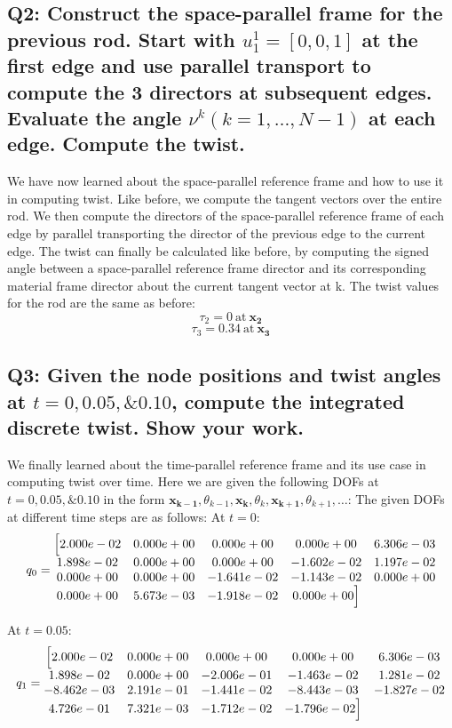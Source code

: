 \documentclass[letterpaper, 10 pt, conference]{ieeeconf}  %
\begin{document}
\subsection*{Q2: Construct the space-parallel frame for the previous rod. Start with $u^1_1 = [0, 0, 1]$ at the first edge and use parallel transport to compute the 3 directors at subsequent edges. Evaluate the angle $ \nu ^ k (k = 1, \dots , N - 1)$ at each edge. Compute the twist. }

We have now learned about the space-parallel reference frame and how to use it in computing twist. Like before, we compute the tangent vectors over the entire rod. We then compute the directors of the space-parallel reference frame of each edge by parallel transporting the director of the previous edge to the current edge. The twist can finally be calculated like before, by computing the signed angle between a space-parallel reference frame director and its corresponding material frame director about the current tangent vector at k. The twist values for the rod are the same as before:
\[ \tau_2 = 0 \ \text{at} \ \mathbf{x_2}\]
\[\tau_3 = 0.34\ \text{at} \ \mathbf{x_3} \]

\subsection*{Q3: Given the node positions and twist angles at $t = 0, 0.05, \& 0.10$, compute the integrated discrete twist. Show your work. }

We finally learned about the time-parallel reference frame and its use case in computing twist over time. Here we are given the following DOFs at $t = 0, 0.05, \& 0.10$ in the form $\mathbf{x_{k-1}}, \theta_{k-1}, \mathbf{x_k}, \theta_k, \mathbf{x_{k+1}}, \theta_{k+1}, \dots$:
The given DOFs at different time steps are as follows:
At \( t = 0 \):
\[ q_0 = \begin{matrix}
\Bigl[2.000e-02 & 0.000e+00 & 0.000e+00 & 0.000e+00 & 6.306e-03  \\
1.898e-02 & 0.000e+00 & 0.000e+00 & -1.602e-02 & 1.197e-02  \\ 
0.000e+00 & 0.000e+00 & -1.641e-02 & -1.143e-02 & 0.000e+00 \\
0.000e+00 & 5.673e-03 & -1.918e-02 & 0.000e+00\Bigr]
\end{matrix} \]

At \( t = 0.05 \):
\[ q_1 = \begin{matrix}
\Bigl[ 2.000e-02 & 0.000e+00 & 0.000e+00 & 0.000e+00 & 6.306e-03 \\
1.898e-02 & 0.000e+00 & -2.006e-01 & -1.463e-02 & 1.281e-02 \\
-8.462e-03 & 2.191e-01 & -1.441e-02 & -8.443e-03 & -1.827e-02 \\
4.726e-01 & 7.321e-03 & -1.712e-02 & -1.796e-02 \Bigr]
\end{matrix} \]
\end{document}

